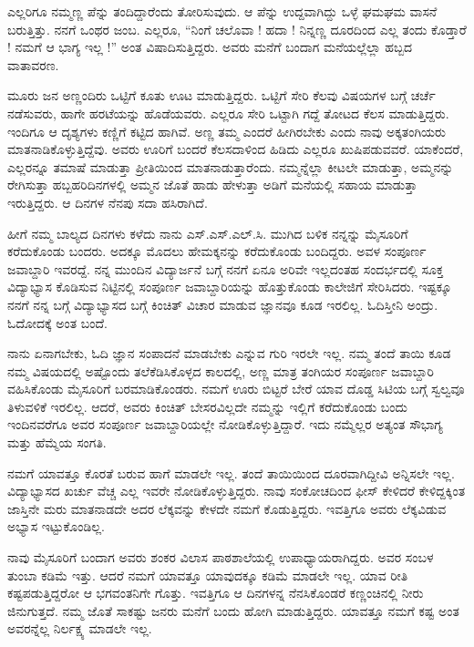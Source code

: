 {ಎಲ್ಲರಿಗೂ ನಮ್ಮಣ್ಣ ಪೆನ್ನು ತಂದಿದ್ದಾರೆಂದು ತೋರಿಸುವುದು. ಆ ಪೆನ್ನು ಉದ್ದ\-ವಾಗಿದ್ದು ಒಳ್ಳೆ ಘಮಘಮ ವಾಸನೆ ಬರುತ್ತಿತ್ತು.  ನನಗೆ ಒಂಥರ ಜಂಬ. ಎಲ್ಲರೂ, “ನಿಂಗೆ ಚಲೊವಾ ! ಹದಾ ! ನಿನ್ನಣ್ಣ ದೂರದಿಂದ ಎಲ್ಲ ತಂದು ಕೊಡ್ತಾರೆ ! ನಮಗೆ ಆ ಭಾಗ್ಯ ಇಲ್ಲ !” ಅಂತ ವಿಷಾದಿಸುತ್ತಿದ್ದರು. ಅವರು ಮನೆಗೆ ಬಂದಾಗ  ಮನೆಯಲ್ಲೆಲ್ಲಾ ಹಬ್ಬದ ವಾತಾವರಣ.  

ಮೂರು ಜನ ಅಣ್ಣಂದಿರು ಒಟ್ಟಿಗೆ ಕೂತು ಊಟ ಮಾಡುತ್ತಿದ್ದರು. ಒಟ್ಟಿಗೆ ಸೇರಿ ಕೆಲವು ವಿಷಯಗಳ ಬಗ್ಗೆ ಚರ್ಚೆ ನಡೆಸುವರು, ಹಾಗೇ ಹರಟೆಯನ್ನು ಹೊಡೆಯವರು.  ಎಲ್ಲರೂ ಸೇರಿ ಒಟ್ಟಾಗಿ ಗದ್ದೆ ತೋಟದ ಕೆಲಸ ಮಾಡುತ್ತಿದ್ದರು. ಇಂದಿಗೂ ಆ ದೃಶ್ಯಗಳು ಕಣ್ಣಿಗೆ ಕಟ್ಟಿದ ಹಾಗಿವೆ.  ಅಣ್ಣ ತಮ್ಮ ಎಂದರೆ ಹೀಗಿರಬೇಕು ಎಂದು ನಾವು ಅಕ್ಕತಂಗಿಯರು ಮಾತನಾಡಿಕೊಳ್ಳುತ್ತಿದ್ದೆವು. ಅವರು ಊರಿಗೆ ಬಂದರೆ ಕೆಲಸದಾಳಿಂದ ಹಿಡಿದು ಎಲ್ಲರೂ ಖುಷಿಪಡುವವರೆ. ಯಾಕೆಂದರೆ, ಎಲ್ಲರನ್ನೂ ತಮಾಷೆ ಮಾಡುತ್ತಾ ಪ್ರೀತಿಯಿಂದ ಮಾತನಾಡುತ್ತಾರೆಂದು.  ನಮ್ಮನ್ನೆಲ್ಲಾ ಕೀಟಲೇ ಮಾಡುತ್ತಾ, ಅಮ್ಮನನ್ನು ರೇಗಿಸುತ್ತಾ ಹಬ್ಬಹರಿದಿನಗಳಲ್ಲಿ ಅಮ್ಮನ ಜೊತೆ ಹಾಡು ಹೇಳುತ್ತಾ ಅಡಿಗೆ ಮನೆಯಲ್ಲಿ ಸಹಾಯ ಮಾಡುತ್ತಾ ಇರುತ್ತಿದ್ದರು. ಆ ದಿನಗಳ ನೆನಪು ಸದಾ ಹಸಿರಾಗಿದೆ.

ಹೀಗೆ ನಮ್ಮ ಬಾಲ್ಯದ ದಿನಗಳು ಕಳೆದು ನಾನು ಎಸ್.ಎಸ್.ಎಲ್.ಸಿ. ಮುಗಿದ ಬಳಿಕ ನನ್ನನ್ನು ಮೈಸೂರಿಗೆ ಕರೆದುಕೊಂಡು ಬಂದರು. ಅದಕ್ಕೂ ಮೊದಲು ಹೇಮಕ್ಕನನ್ನು ಕರೆದು\-ಕೊಂಡು ಬಂದಿದ್ದರು. ಅವಳ ಸಂಪೂರ್ಣ ಜವಾಬ್ದಾರಿ ಇವರದ್ದೆ.  ನನ್ನ ಮುಂದಿನ ವಿದ್ಯಾರ್ಜನೆ ಬಗ್ಗೆ ನನಗೆ ಏನೂ ಅರಿವೇ ಇಲ್ಲದಂತಹ ಸಂದರ್ಭದಲ್ಲಿ ಸೂಕ್ತ ವಿದ್ಯಾಭ್ಯಾಸ ಕೊಡಿಸುವ ನಿಟ್ಟಿನಲ್ಲಿ  ಸಂಪೂರ್ಣ  ಜವಾಬ್ದಾರಿಯನ್ನು ಹೊತ್ತುಕೊಂಡು ಕಾಲೇಜಿಗೆ ಸೇರಿಸಿದರು. ಇಷ್ಟಕ್ಕೂ ನನಗೆ ನನ್ನ ಬಗ್ಗೆ ವಿದ್ಯಾಭ್ಯಾಸದ ಬಗ್ಗೆ ಕಿಂಚಿತ್ ವಿಚಾರ ಮಾಡುವ ಜ್ಞಾನವೂ ಕೂಡ ಇರಲಿಲ್ಲ. ಓದಿಸ್ತೀನಿ ಅಂದ್ರು. ಓದೋದಕ್ಕೆ ಅಂತ ಬಂದೆ. 

ನಾನು ಏನಾಗಬೇಕು, ಓದಿ ಜ್ಞಾನ ಸಂಪಾದನೆ ಮಾಡಬೇಕು ಎನ್ನುವ ಗುರಿ ಇರಲೇ ಇಲ್ಲ. ನಮ್ಮ ತಂದೆ ತಾಯಿ ಕೂಡ ನಮ್ಮ ವಿಷಯದಲ್ಲಿ ಅಷ್ಟೊಂದು ತಲೆಕೆಡಿಸಿಕೊಳ್ಳದ ಕಾಲದಲ್ಲಿ, ಅಣ್ಣ ಮಾತ್ರ ತಂಗಿಯರ ಸಂಪೂರ್ಣ ಜವಾಬ್ದಾರಿ ವಹಿಸಿಕೊಂಡು ಮೈಸೂರಿಗೆ ಬರ\-ಮಾಡಿಕೊಂಡರು. ನಮಗೆ ಊರು ಬಿಟ್ಟರೆ ಬೇರೆ ಯಾವ ದೊಡ್ಡ ಸಿಟಿಯ ಬಗ್ಗೆ ಸ್ವಲ್ವವೂ ತಿಳುವಳಿಕೆ ಇರಲಿಲ್ಲ. ಆದರೆ, ಅವರು ಕಿಂಚಿತ್ ಬೇಸರವಿಲ್ಲದೇ ನಮ್ಮನ್ನು ಇಲ್ಲಿಗೆ ಕರೆದು\-ಕೊಂಡು ಬಂದು ಇಂದಿನವರೆಗೂ ಅವರ ಸಂಪೂರ್ಣ ಜವಾಬ್ದಾರಿಯಲ್ಲೇ ನೋಡಿ\-ಕೊಳ್ಳುತ್ತಿದ್ದಾರೆ.  ಇದು ನಮ್ಮೆಲ್ಲರ ಅತ್ಯಂತ ಸೌಭಾಗ್ಯ ಮತ್ತು ಹೆಮ್ಮೆಯ ಸಂಗತಿ. 

ನಮಗೆ ಯಾವತ್ತೂ ಕೊರತೆ ಬರುವ ಹಾಗೆ ಮಾಡಲೇ ಇಲ್ಲ. ತಂದೆ   \enginline{-}   ತಾಯಿಯಿಂದ ದೂರವಾಗಿದ್ದೀವಿ ಅನ್ನಿಸಲೇ ಇಲ್ಲ. ವಿದ್ಯಾಭ್ಯಾಸದ ಖರ್ಚು ವೆಚ್ಚ ಎಲ್ಲ ಇವರೇ ನೋಡಿಕೊಳ್ಳುತ್ತಿದ್ದರು.  ನಾವು ಸಂಕೋಚದಿಂದ ಫೀಸ್ ಕೇಳಿದರೆ ಕೇಳಿದ್ದಕ್ಕಿಂತ ಜಾಸ್ತಿನೇ ಮರು ಮಾತನಾಡದೇ ಅದರ ಲೆಕ್ಕವನ್ನು ಕೇಳದೇ ನಮಗೆ ಕೊಡುತ್ತಿದ್ದರು.  ಇವತ್ತಿಗೂ ಅವರು ಲೆಕ್ಕವಿಡುವ ಅಭ್ಯಾಸ ಇಟ್ಟುಕೊಂಡಿಲ್ಲ.

ನಾವು ಮೈಸೂರಿಗೆ ಬಂದಾಗ ಅವರು ಶಂಕರ ವಿಲಾಸ  ಪಾಠಶಾಲೆಯಲ್ಲಿ ಉಪಾ\-ಧ್ಯಾಯ\-ರಾಗಿದ್ದರು.  ಅವರ ಸಂಬಳ ತುಂಬಾ ಕಡಿಮೆ ಇತ್ತು. ಆದರೆ ನಮಗೆ ಯಾವತ್ತೂ ಯಾವುದಕ್ಕೂ ಕಡಿಮೆ ಮಾಡಲೇ ಇಲ್ಲ.  ಯಾವ ರೀತಿ ಕಷ್ಟಪಡುತ್ತಿದ್ದರೋ ಆ ಭಗವಂತನಿಗೇ ಗೊತ್ತು.  ಇವತ್ತಿಗೂ ಆ ದಿನಗಳನ್ನ ನೆನಸಿಕೊಂಡರೆ ಕಣ್ಣಂಚಿನಲ್ಲಿ ನೀರು ಜಿನುಗುತ್ತದೆ. ನಮ್ಮ ಜೊತೆ ಸಾಕಷ್ಟು ಜನರು ಮನೆಗೆ ಬಂದು   \enginline{-}   ಹೋಗಿ ಮಾಡುತ್ತಿದ್ದರು. ಯಾವತ್ತೂ ನಮಗೆ ಕಷ್ಟ ಅಂತ ಅವರನ್ನೆಲ್ಲ ನಿರ್ಲಕ್ಷ್ಯ ಮಾಡಲೇ ಇಲ್ಲ.

}
